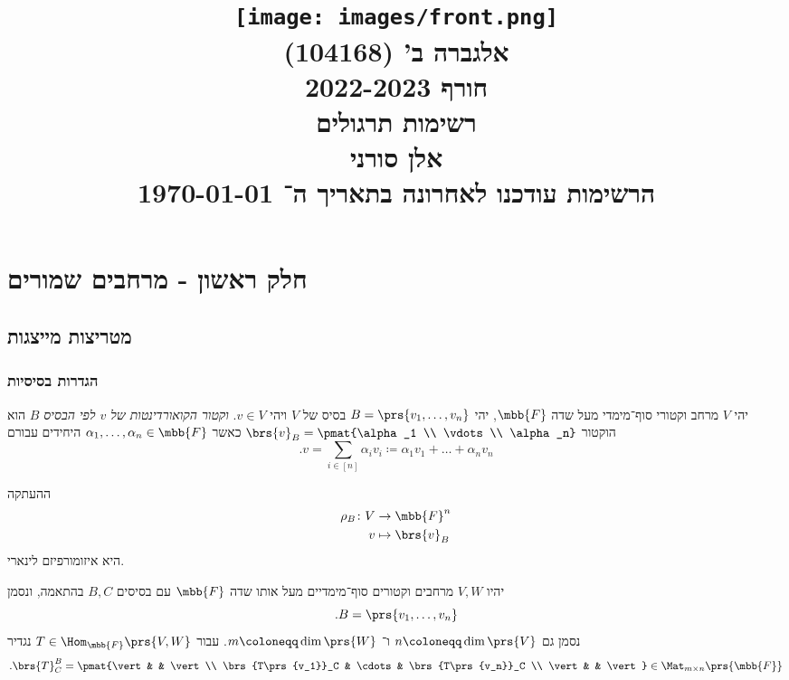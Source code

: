 \documentclass[a4paper,10pt,twoside,openany]{book}
\title{
\texttt{[image: images/front.png]}\\
\vspace{30pt}
\Huge
אלגברה ב' (104168)
\\
חורף 2022-2023
\\
רשימות תרגולים
\vspace{30pt}
\\
\huge
אלן סורני
\vspace{30pt}
\\
\Large
הרשימות עודכנו לאחרונה בתאריך ה־%
\today
}
\date{}
\begin{document}
\frontmatter
\maketitle
\tableofcontents

\mainmatter

\part{חלק ראשון - מרחבים שמורים}

\chapter{מטריצות מייצגות}

\section{הגדרות בסיסיות}

\begin{definition}
יהי
$V$
מרחב וקטורי סוף־מימדי מעל שדה
$\mbb{F}$,
יהי
$B = \prs{v_1, \ldots, v_n}$
בסיס של
$V$
ויהי
$v \in V$.
\emph{וקטור הקואורדינטות של
$v$
לפי הבסיס
$B$}
הוא הוקטור
$\brs{v}_B = \pmat{\alpha_1 \\ \vdots \\ \alpha_n}$
כאשר
$\alpha_1, \ldots, \alpha_n \in \mbb{F}$
היחידים עבורם
\[\text{.}v = \sum_{i \in [n]} \alpha_i v_i \coloneqq \alpha_1 v_1 + \ldots + \alpha_n v_n\]
\end{definition}

\begin{remark}
ההעתקה
\begin{align*}
\rho_B \colon V &\to \mbb{F}^n \\
v &\mapsto \brs{v}_B
\end{align*}
היא איזומורפיזם לינארי.
\end{remark}

\begin{definition}
יהיו
$V,W$
מרחבים וקטורים סוף־מימדיים מעל אותו שדה
$\mbb{F}$
עם בסיסים
$B,C$
בהתאמה, ונסמן
\[\text{.} B = \prs{v_1, \ldots, v_n}\]
נסמן גם
$n \coloneqq \dim\prs{V}$
ו־%
$m \coloneqq \dim\prs{W}$.
עבור
$T \in \Hom_{\mbb{F}}\prs{V,W}$
נגדיר
\[\text{.} \brs{T}^B_C = \pmat{\vert & & \vert \\ \brs{T\prs{v_1}}_C & \cdots & \brs{T\prs{v_n}}_C \\ \vert & & \vert} \in \Mat_{m \times n}\prs{\mbb{F}}\]
\end{definition}
\end{document}
